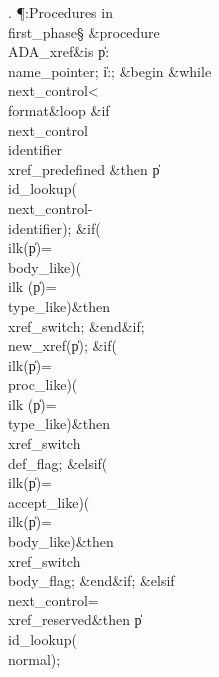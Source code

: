 . \P\?:Procedures in \\{first\_phase}\X\S\?\6
\&{procedure}\8\1\\{ADA\_xref}\2\8\&{is}\8\1\6
\|p\?:\?\\{name\_pointer};\6
\|i\?:\?;\6
\4\&{begin}\6
\1\&{while}\8\\{next\_control}\?<\?\\{format}\8\&{loop}\6
\&{if}\1\1\8\\{next\_control}\?\in\?\\{identifier}\?\to\?\\{xref\_predefined}\2%
\8\&{then}\6
\|p\?\K\?\\{id\_lookup}\?\1(\?\\{next\_control}\?-\?\\{identifier}\?\2)\?;\6
\&{if}\1\1\?\8\1(\?\\{ilk}\?\1(\?\|p\?\2)=\?\\{body\_like}\?\2)\V\1(\?\\{ilk}\?%
\1(\?\|p\?\2)=\?\\{type\_like}\?\2)\?\2\8\&{then}\6
\\{xref\_switch}\?\K{};\2\6
\&{end}\8\2\&{if}\1;\6
\\{new\_xref}\?\1(\?\|p\?\2)\?;\6
\&{if}\1\1\?\8\1(\?\\{ilk}\?\1(\?\|p\?\2)=\?\\{proc\_like}\?\2)\V\1(\?\\{ilk}\?%
\1(\?\|p\?\2)=\?\\{type\_like}\?\2)\?\2\8\&{then}\6
\\{xref\_switch}\?\K\?\\{def\_flag};\6
\4\&{elsif}\1\?\8\1(\?\\{ilk}\?\1(\?\|p\?\2)=\?\\{accept\_like}\?\2)\V\1(\?%
\\{ilk}\?\1(\?\|p\?\2)=\?\\{body\_like}\?\2)\?\2\8\&{then}\6
\\{xref\_switch}\?\K\?\\{body\_flag};\2\6
\&{end}\8\2\&{if}\1;\6
\4\&{elsif}\1\8\\{next\_control}\?=\?\\{xref\_reserved}\2\8\&{then}\6
\|p\?\K\?\\{id\_lookup}\?\1(\?\\{normal}\?\2)\?;\5
